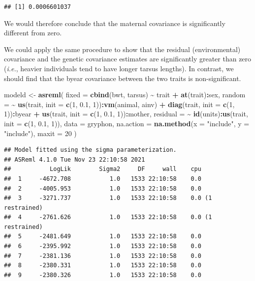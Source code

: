 \documentclass[
  12pt,
]{book}
\newenvironment{Shaded}{\begin{snugshade}}{\end{snugshade}}
\newcommand{\DataTypeTok}[1]{\textcolor[rgb]{0.13,0.29,0.53}{#1}}
\newcommand{\DecValTok}[1]{\textcolor[rgb]{0.00,0.00,0.81}{#1}}
\newcommand{\FloatTok}[1]{\textcolor[rgb]{0.00,0.00,0.81}{#1}}
\newcommand{\KeywordTok}[1]{\textcolor[rgb]{0.13,0.29,0.53}{\textbf{#1}}}
\newcommand{\NormalTok}[1]{#1}
\newcommand{\OperatorTok}[1]{\textcolor[rgb]{0.81,0.36,0.00}{\textbf{#1}}}
\newcommand{\StringTok}[1]{\textcolor[rgb]{0.31,0.60,0.02}{#1}}
\begin{document}
\begin{verbatim}
## [1] 0.0006601037
\end{verbatim}

We would therefore conclude that the maternal covariance is significantly different from zero.

We could apply the same procedure to show that the residual (environmental) covariance and the genetic covariance estimates are significantly greater than zero (\emph{i.e.}, heavier individuals tend to have longer tarsus lengths). In contrast, we should find that the byear covariance between the two traits is non-significant.

\begin{Shaded}
\begin{Highlighting}[]
\NormalTok{modeld \textless{}{-}}\StringTok{ }\KeywordTok{asreml}\NormalTok{(}
  \DataTypeTok{fixed =} \KeywordTok{cbind}\NormalTok{(bwt, tarsus) }\OperatorTok{\textasciitilde{}}\StringTok{ }\NormalTok{trait }\OperatorTok{+}\StringTok{ }\KeywordTok{at}\NormalTok{(trait)}\OperatorTok{:}\NormalTok{sex,}
  \DataTypeTok{random =} \OperatorTok{\textasciitilde{}}\StringTok{ }\KeywordTok{us}\NormalTok{(trait, }\DataTypeTok{init =} \KeywordTok{c}\NormalTok{(}\DecValTok{1}\NormalTok{, }\FloatTok{0.1}\NormalTok{, }\DecValTok{1}\NormalTok{))}\OperatorTok{:}\KeywordTok{vm}\NormalTok{(animal, ainv) }\OperatorTok{+}
\StringTok{    }\KeywordTok{diag}\NormalTok{(trait, }\DataTypeTok{init =} \KeywordTok{c}\NormalTok{(}\DecValTok{1}\NormalTok{, }\DecValTok{1}\NormalTok{))}\OperatorTok{:}\NormalTok{byear }\OperatorTok{+}
\StringTok{    }\KeywordTok{us}\NormalTok{(trait, }\DataTypeTok{init =} \KeywordTok{c}\NormalTok{(}\DecValTok{1}\NormalTok{, }\FloatTok{0.1}\NormalTok{, }\DecValTok{1}\NormalTok{))}\OperatorTok{:}\NormalTok{mother,}
  \DataTypeTok{residual =} \OperatorTok{\textasciitilde{}}\StringTok{ }\KeywordTok{id}\NormalTok{(units)}\OperatorTok{:}\KeywordTok{us}\NormalTok{(trait, }\DataTypeTok{init =} \KeywordTok{c}\NormalTok{(}\DecValTok{1}\NormalTok{, }\FloatTok{0.1}\NormalTok{, }\DecValTok{1}\NormalTok{)),}
  \DataTypeTok{data =}\NormalTok{ gryphon,}
  \DataTypeTok{na.action =} \KeywordTok{na.method}\NormalTok{(}\DataTypeTok{x =} \StringTok{"include"}\NormalTok{, }\DataTypeTok{y =} \StringTok{"include"}\NormalTok{),}
  \DataTypeTok{maxit =} \DecValTok{20}
\NormalTok{)}
\end{Highlighting}
\end{Shaded}

\begin{verbatim}
## Model fitted using the sigma parameterization.
## ASReml 4.1.0 Tue Nov 23 22:10:58 2021
##           LogLik        Sigma2     DF     wall    cpu
##  1     -4672.708           1.0   1533 22:10:58    0.0
##  2     -4005.953           1.0   1533 22:10:58    0.0
##  3     -3271.737           1.0   1533 22:10:58    0.0 (1 restrained)
##  4     -2761.626           1.0   1533 22:10:58    0.0 (1 restrained)
##  5     -2481.649           1.0   1533 22:10:58    0.0
##  6     -2395.992           1.0   1533 22:10:58    0.0
##  7     -2381.136           1.0   1533 22:10:58    0.0
##  8     -2380.331           1.0   1533 22:10:58    0.0
##  9     -2380.326           1.0   1533 22:10:58    0.0
\end{verbatim}
\end{document}
